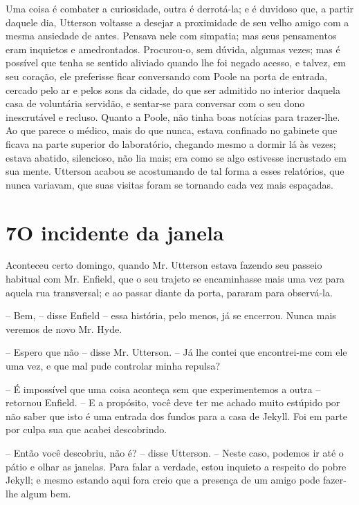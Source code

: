 Uma coisa é combater a curiosidade, outra é derrotá-la; e é duvidoso
que, a partir daquele dia, Utterson voltasse a desejar a proximidade de
seu velho amigo com a mesma ansiedade de antes.  Pensava nele com
simpatia; mas seus pensamentos eram inquietos e amedrontados. 
Procurou-o, sem dúvida, algumas vezes; mas é possível que tenha se
sentido aliviado quando lhe foi negado acesso, e talvez, em
seu coração, ele preferisse ficar conversando com Poole na porta de
entrada, cercado pelo ar e pelos sons da cidade, do que ser admitido no
interior daquela casa de voluntária servidão, e sentar-se para
conversar com o seu dono inescrutável e recluso.  Quanto a Poole, não
tinha boas notícias para trazer-lhe.  Ao que parece o médico, mais do
que nunca, estava confinado no gabinete que ficava na parte superior do
laboratório, chegando mesmo a dormir lá às vezes; estava abatido,
silencioso, não lia mais; era como se algo estivesse incrustado em
sua mente.  Utterson acabou se acostumando de tal forma a esses
relatórios, que nunca variavam, que suas visitas foram se tornando cada
vez mais espaçadas. 


\chapter[7 -- O incidente da janela]{7\break O incidente da janela}

Aconteceu certo domingo, quando Mr. Utterson estava fazendo seu passeio
habitual com Mr. Enfield, que o seu trajeto se encaminhasse mais uma
vez para aquela rua transversal; e ao passar diante da porta, pararam
para \mbox{observá-la}.

-- Bem, -- disse Enfield -- essa história, pelo menos, já se encerrou. 
Nunca mais veremos de novo Mr. Hyde. 

-- Espero que não -- disse Mr. Utterson. -- Já lhe contei que
encontrei-me com ele uma vez, e que mal pude controlar minha repulsa?

-- É impossível que uma coisa aconteça sem que experimentemos a outra --
retornou Enfield. -- E a propósito, você deve ter me achado muito
estúpido por não saber que isto é uma entrada dos fundos para a casa de
Jekyll.  Foi em parte por culpa sua que acabei descobrindo.

-- Então você descobriu, não é? -- disse Utterson. -- Neste caso, podemos
ir até o pátio e olhar as janelas.  Para falar a verdade, estou
inquieto a respeito do pobre Jekyll; e mesmo estando aqui fora creio
que a presença de um amigo pode fazer-lhe algum bem.

